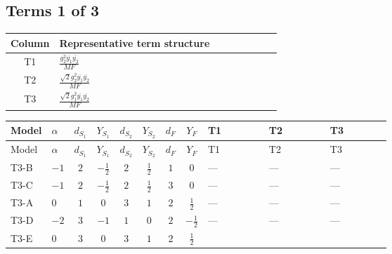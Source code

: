 \documentclass[8pt]{article}
\begin{document}
\begin{landscape}
\subsection*{Terms 1 of 3}
\begin{center}
\begin{tabular}{@{}c >{\raggedright\arraybackslash}p{0.82\linewidth}@{}}
\toprule
Column & Representative term structure \\
\midrule
T1 & \(\displaystyle \frac{g_{2}^{2} \overline{y_{1}} \overline{y_{2}}}{MF}\) \\
\midrule
T2 & \(\displaystyle \frac{\sqrt{2} g_{2}^{2} \overline{y_{1}} \overline{y_{2}}}{MF}\) \\
\midrule
T3 & \(\displaystyle \frac{\sqrt{2} g_{1}^{2} \overline{y_{1}} \overline{y_{2}}}{MF}\) \\
\midrule
\bottomrule
\end{tabular}
\end{center}
\smallskip
\tiny
\begin{longtable}{@{}llcccccc >{\raggedright\arraybackslash}p{0.21\linewidth} >{\raggedright\arraybackslash}p{0.21\linewidth} >{\raggedright\arraybackslash}p{0.21\linewidth}@{}}
\toprule
Model & $\alpha$ & $d_{S_1}$ & $Y_{S_1}$ & $d_{S_2}$ & $Y_{S_2}$ & $d_F$ & $Y_F$ & T1 & T2 & T3 \\
\midrule
\endfirsthead
\toprule
Model & $\alpha$ & $d_{S_1}$ & $Y_{S_1}$ & $d_{S_2}$ & $Y_{S_2}$ & $d_F$ & $Y_F$ & T1 & T2 & T3 \\
\midrule
\endhead
T3-B & $-1$ & $2$ & $-\frac{1}{2}$ & $2$ & $\frac{1}{2}$ & $1$ & $0$ & --- & --- & --- \\
\midrule
T3-C & $-1$ & $2$ & $-\frac{1}{2}$ & $2$ & $\frac{1}{2}$ & $3$ & $0$ & --- & --- & --- \\
\midrule
T3-A & $0$ & $1$ & $0$ & $3$ & $1$ & $2$ & $\frac{1}{2}$ & --- & --- & --- \\
\midrule
T3-D & $-2$ & $3$ & $-1$ & $1$ & $0$ & $2$ & $-\frac{1}{2}$ & --- & --- & --- \\
\midrule
T3-E & $0$ & $3$ & $0$ & $3$ & $1$ & $2$ & $\frac{1}{2}$ & \scriptsize\adjustbox{max width=\linewidth}{$\begin{gathered} - \frac{g_{2}^{2} \overline{y_{1}} \overline{y_{2}}}{2 MF}\end{gathered}$} & \scriptsize\adjustbox{max width=\linewidth}{$\begin{gathered} - \frac{45 \sqrt{2} g_{2}^{2} \overline{y_{1}} \overline{y_{2}}}{16 MF}\end{gathered}$} & \scriptsize\adjustbox{max width=\linewidth}{$\begin{gathered} - \frac{3 \sqrt{2} g_{1}^{2} \overline{y_{1}} \overline{y_{2}}}{16 MF}\end{gathered}$} \\
\midrule
\bottomrule
\end{longtable}
\clearpage

\end{landscape}
\end{document}
